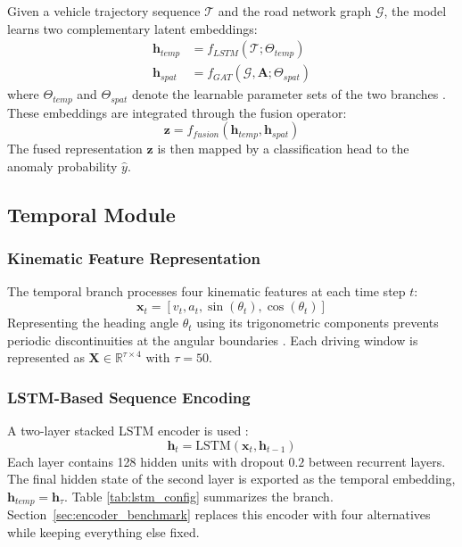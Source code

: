 \documentclass[journal]{IEEEtran}
\begin{document}
Given a vehicle trajectory sequence $\mathcal{T}$ and the road network graph $\mathcal{G}$, the model learns two complementary latent embeddings:
\begin{align}
  \mathbf{h}_{temp} &= f_{LSTM}(\mathcal{T}; \Theta_{temp}) \\
  \mathbf{h}_{spat} &= f_{GAT}(\mathcal{G}, \mathbf{A}; \Theta_{spat})
\end{align}
where $\Theta_{temp}$ and $\Theta_{spat}$ denote the learnable parameter sets of the two branches \cite{wang_multi-scale_2025, he_c_2025}. These embeddings are integrated through the fusion operator:
\begin{equation}
  \mathbf{z} = f_{fusion}(\mathbf{h}_{temp}, \mathbf{h}_{spat})
\end{equation}
The fused representation $\mathbf{z}$ is then mapped by a classification head to the anomaly probability $\hat{y}$.

\subsection{Temporal Module}

\subsubsection{Kinematic Feature Representation}
The temporal branch processes four kinematic features at each time step $t$:
\begin{equation}
  \mathbf{x}_t = [v_t, a_t, \sin(\theta_t), \cos(\theta_t)]
\end{equation}
Representing the heading angle $\theta_t$ using its trigonometric components prevents periodic discontinuities at the angular boundaries \cite{taheri_sarteshnizi_applicability_2026}. Each driving window is represented as $\mathbf{X} \in \mathbb{R}^{\tau \times 4}$ with $\tau = 50$.

\subsubsection{LSTM-Based Sequence Encoding}
A two-layer stacked LSTM encoder is used \cite{zhou_hybrid_2022, taheri_sarteshnizi_applicability_2026, hirata_traffic_2025}:
\begin{equation}
  \mathbf{h}_t = \text{LSTM}(\mathbf{x}_t, \mathbf{h}_{t-1})
\end{equation}
Each layer contains 128 hidden units with dropout $0.2$ between recurrent layers. The final hidden state of the second layer is exported as the temporal embedding, $\mathbf{h}_{temp} = \mathbf{h}_\tau$. Table \ref{tab:lstm_config} summarizes the branch. Section~\ref{sec:encoder_benchmark} replaces this encoder with four alternatives while keeping everything else fixed.
\end{document}
